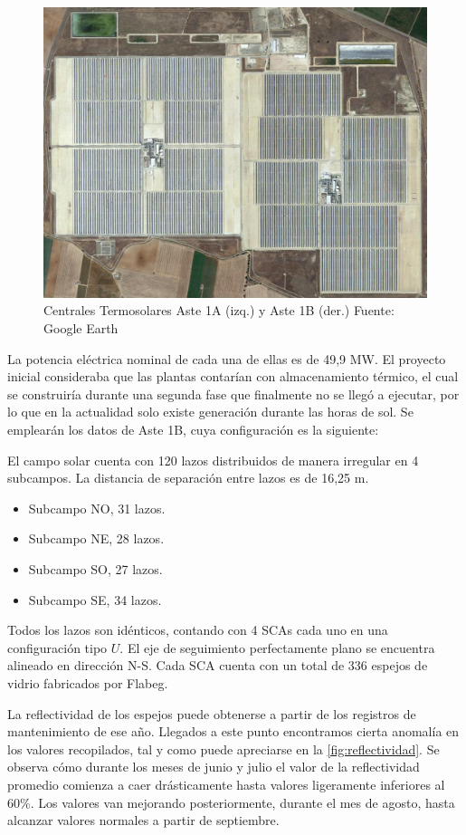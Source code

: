 \begin{figure}[H]
\includegraphics[width=0.9\linewidth]{images/fotoAstes.png}
\caption[Vista aérea de las centrales Aste 1A y Aste 1B]{Centrales Termosolares Aste 1A (izq.) y Aste 1B (der.) Fuente: Google Earth} 
\label{fig:astes}
\end{figure}

La potencia eléctrica nominal de cada una de ellas es de 49,9 MW. El proyecto inicial consideraba que las plantas contarían con almacenamiento térmico, el cual se construiría durante una segunda fase que finalmente no se llegó a ejecutar, por lo que en la actualidad solo existe generación durante las horas de sol. Se emplearán los datos de Aste 1B, cuya configuración es la siguiente:

El campo solar cuenta con 120 lazos distribuidos de manera irregular en 4 subcampos. La  distancia de separación entre lazos es de 16,25 m. 

\begin{itemize}[itemsep=2pt,parsep=2pt]
\item
  Subcampo NO, 31 lazos.
\item
  Subcampo NE, 28 lazos.
\item
  Subcampo SO, 27 lazos.
\item
  Subcampo SE, 34 lazos.
\end{itemize}

Todos los lazos son idénticos, contando con 4 SCAs cada uno en una configuración tipo \(U\). El eje de seguimiento perfectamente plano se encuentra alineado en dirección N-S. Cada SCA cuenta con un total de 336 espejos de vidrio fabricados por Flabeg. 

La reflectividad de los espejos puede obtenerse a partir de los registros de mantenimiento de ese año. Llegados a este punto encontramos cierta anomalía en los valores recopilados, tal y como puede apreciarse en la \ref{fig:reflectividad}. Se observa cómo durante los meses de junio y julio el valor de la reflectividad promedio comienza a caer drásticamente hasta valores ligeramente inferiores al 60\%. Los valores van mejorando posteriormente, durante el mes de agosto, hasta alcanzar valores normales a partir de septiembre.

